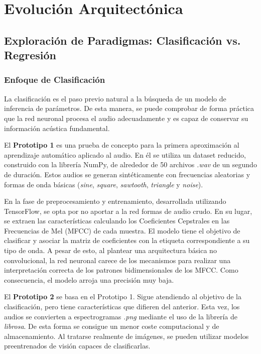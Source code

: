 \chapter{Evolución Arquitectónica}
\label{cap:EvolucionArquitectonica}

\section{Exploración de Paradigmas: Clasificación vs. Regresión}
\subsection{Enfoque de Clasificación}
La clasificación es el paso previo natural a la búsqueda de un modelo de inferencia de parámetros.
De esta manera, se puede comprobar de forma práctica que la red neuronal procesa el audio adecuadamente
y es capaz de conservar su información acústica fundamental.

El \textbf{Prototipo 1} es una prueba de concepto para la primera aproximación al aprendizaje automático aplicado al audio.
En él se utiliza un dataset reducido, construido con la librería NumPy, de alrededor de 50 archivos \textit{.wav} de un segundo de duración.
Estos audios se generan sintéticamente
con frecuencias aleatorias y formas de onda básicas (\textit{sine}, \textit{square}, \textit{sawtooth}, \textit{triangle} y \textit{noise}).

En la fase de preprocesamiento y entrenamiento, desarrollada utilizando TensorFlow, se opta por
no aportar a la red formas de audio crudo. En su lugar, se extraen las características calculando
los Coeficientes Cepstrales en las Frecuencias de Mel (MFCC) de cada muestra. El modelo tiene el objetivo de clasificar 
y asociar la matriz de coeficientes con la etiqueta correspondiente a su tipo de onda. A pesar de esto, 
al plantear una arquitectura básica no convolucional, la red neuronal carece de los mecanismos para
realizar una interpretación correcta de los patrones bidimensionales de los MFCC. Como consecuencia, el 
modelo arroja una precisión muy baja. 

El \textbf{Prototipo 2} se basa en el Prototipo 1. Sigue atendiendo al objetivo de la clasificación, pero tiene 
características que difieren del anterior. Esta vez, los audios se convierten a espectrogramas \textit{.png}
mediante el uso de la librería de \textit{librosa}. De esta forma se consigue un menor coste computacional y de almacenamiento.
Al tratarse realmente de imágenes, se pueden utilizar modelos preentrenados de visión capaces de clasificarlas.

